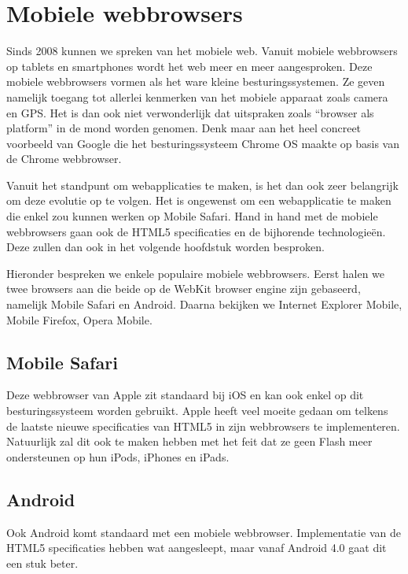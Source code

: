 
\section{Mobiele webbrowsers}
Sinds 2008 kunnen we spreken van het mobiele web. Vanuit mobiele webbrowsers op tablets en smartphones wordt het web meer en meer aangesproken. Deze mobiele webbrowsers vormen als het ware kleine besturingssystemen. Ze geven namelijk toegang tot allerlei kenmerken van het mobiele apparaat zoals camera en GPS. Het is dan ook niet verwonderlijk dat uitspraken zoals “browser als platform” in de mond worden genomen. Denk maar aan het heel concreet voorbeeld van Google die het besturingssysteem Chrome OS maakte op basis van de Chrome webbrowser.

Vanuit het standpunt om webapplicaties te maken, is het dan ook zeer belangrijk om deze evolutie op te volgen. Het is ongewenst om een webapplicatie te maken die enkel zou kunnen werken op Mobile Safari. Hand in hand met de mobiele webbrowsers gaan ook de HTML5 specificaties en de bijhorende technologieën. Deze zullen dan ook in het volgende hoofdstuk worden besproken.

Hieronder bespreken we enkele populaire mobiele webbrowsers. Eerst halen we twee browsers aan die beide op de WebKit browser engine zijn gebaseerd, namelijk Mobile Safari en Android. Daarna bekijken we Internet Explorer Mobile, Mobile Firefox, Opera Mobile.

\subsection{Mobile Safari}
Deze webbrowser van Apple zit standaard bij iOS en kan ook enkel op dit besturingssysteem worden gebruikt. Apple heeft veel moeite gedaan om telkens de laatste nieuwe specificaties van HTML5 in zijn webbrowsers te implementeren. Natuurlijk zal dit ook te maken hebben met het feit dat ze geen Flash meer ondersteunen op hun iPods, iPhones en iPads.

\subsection{Android}
Ook Android komt standaard met een mobiele webbrowser. Implementatie van de HTML5 specificaties hebben wat aangesleept, maar vanaf Android 4.0 gaat dit een stuk beter.

